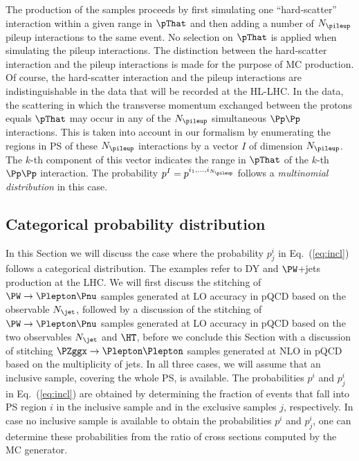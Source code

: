 The production of the samples proceeds by first simulating one ``hard-scatter'' interaction within a given range in $\pThat$
and then adding a number of $N_{\pileup}$ pileup interactions to the same event.
No selection on $\pThat$ is applied when simulating the pileup interactions.
The distinction between the hard-scatter interaction and the pileup interactions is made for the purpose of MC production.
Of course, the hard-scatter interaction and the pileup interactions are indistinguishable in the data that will be recorded at the HL-LHC.
In the data, the scattering in which the transverse momentum exchanged between the protons equals $\pThat$ may occur in any of the $N_{\pileup}$ simultaneous $\Pp\Pp$ interactions.
This is taken into account in our formalism by enumerating the regions in PS of these $N_{\pileup}$ interactions by a vector $I$ of dimension $N_{\pileup}$.
The $k$-th component of this vector indicates the range in $\pThat$ of the $k$-th $\Pp\Pp$ interaction.
The probability $p^{I} = p^{i_{1},\dots,i_{N_{\pileup}}}$ follows a {\em multinomial distribution} in this case.


\subsection{Categorical probability distribution}
\label{sec:examples_background_yield}

In this Section we will discuss the case where the probability $p_{j}^{i}$ in Eq.~(\ref{eq:incl}) follows a categorical distribution.
The examples refer to DY and $\PW$+jets production at the LHC.
We will first discuss the stitching of $\PW \to \Plepton\Pnu$ samples generated at LO accuracy in pQCD based on the observable $N_{\jet}$, 
followed by a discussion of the stitching of $\PW \to \Plepton\Pnu$ samples generated at LO accuracy in pQCD based on the two observables $N_{\jet}$ and $\HT$,
before we conclude this Section with a discussion of stitching $\PZggx \to \Plepton\Plepton$ samples generated at NLO in pQCD based on the multiplicity of jets.
In all three cases, we will assume that an inclusive sample, covering the whole PS, is available.
The probabilities $p^{i}$ and $p_{j}^{i}$ in Eq.~(\ref{eq:incl})
are obtained by determining the fraction of events that fall into PS region $i$ in the inclusive sample and in the exclusive samples $j$, respectively.
In case no inclusive sample is available to obtain the probabilities $p^{i}$ and $p_{j}^{i}$,
one can determine these probabilities from the ratio of cross sections computed by the MC generator.

